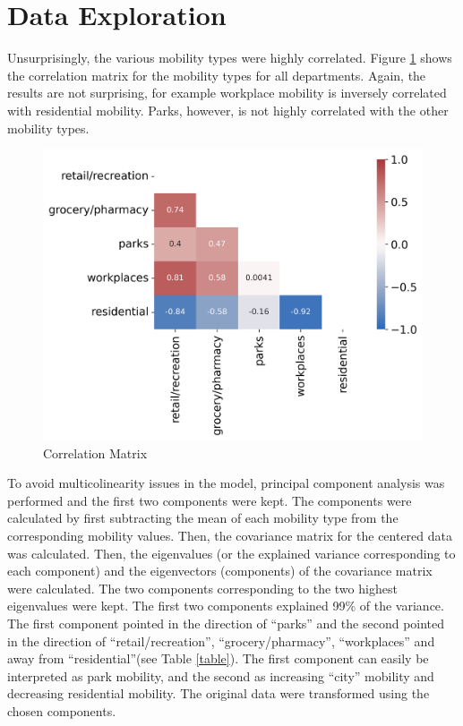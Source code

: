 \documentclass[paper=a4, fontsize=11pt]{scrartcl}
\begin{document}
\section{Data Exploration}
Unsurprisingly, the various mobility types were highly correlated. Figure \ref{corr_mat} shows the correlation matrix for the mobility types for all departments. Again, the results are not surprising,  for example workplace mobility is inversely correlated with residential mobility. Parks, however, is not highly correlated with the other mobility types.


\begin{figure}[!htb]\label{corr_mat}
\centering
\includegraphics[width=.7\textwidth]{corr.png}
\caption{Correlation Matrix}
\end{figure}

To avoid multicolinearity issues in the model, principal component analysis was performed and the first two components were kept. The components were calculated by first subtracting the mean of each mobility type from the corresponding mobility values. Then, the covariance matrix for the centered data was calculated. Then, the eigenvalues (or the explained variance corresponding to each component) and the eigenvectors (components) of the covariance matrix were calculated. The two components corresponding to the two highest eigenvalues were kept. The first two components explained 99\% of the variance. The first component  pointed in the direction of ``parks'' and the second pointed in the direction of ``retail/recreation'', ``grocery/pharmacy'', ``workplaces'' and away from ``residential''(see Table \ref{table}). The first component can easily be interpreted as park mobility, and the second as increasing ``city'' mobility and decreasing residential mobility. The original data were transformed using the chosen components.\\
\end{document}
